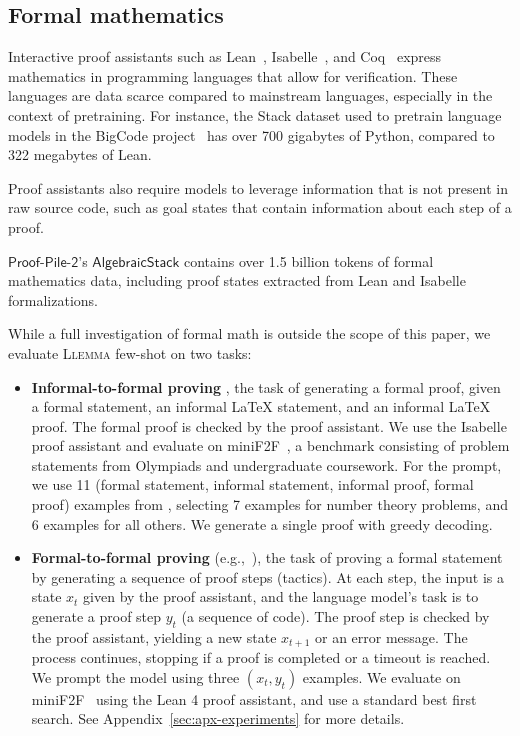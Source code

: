 \subsection{Formal mathematics} Interactive proof assistants such as Lean~\citep{de2015lean}, Isabelle~\citep{wenzel2008isabelle}, and Coq~\citep{paulin1989extracting,paulin1989extraction} express mathematics in  programming languages that allow for verification. These languages are data scarce compared to mainstream languages, especially in the context of pretraining. For instance, the Stack dataset used to pretrain language models in the BigCode project~\citep{allal2023santacoder} has over 700 gigabytes of Python, compared to 322 megabytes of Lean.

Proof assistants also require models to leverage information that is not present in raw source code, such as goal states that contain information about each step of a proof.

$\mathsf{Proof}$-$\mathsf{Pile}$-$\mathsf{2}$'s $\mathsf{AlgebraicStack}$   contains over 1.5 billion tokens of formal mathematics data, including proof states extracted from  Lean and Isabelle formalizations.

While a full investigation of formal math is outside the scope of this paper, we evaluate \textsc{Llemma} few-shot on two tasks:

\begin{itemize}[leftmargin=*]
\item \textbf{Informal-to-formal proving} \citep{jiang2023draft}, the task of generating a formal proof, given a formal statement, an informal \LaTeX{} statement, and an informal \LaTeX{} proof. The formal proof is checked by the proof assistant. We use the Isabelle proof assistant and evaluate on miniF2F~\citep{zheng2021minif2f}, a benchmark consisting of problem statements from Olympiads and undergraduate coursework. For the prompt, we use 11 (formal statement, informal statement, informal proof, formal proof) examples from \cite{jiang2023draft}, selecting 7 examples for number theory problems, and 6 examples for all others. We generate a single proof with greedy decoding.

\item \textbf{Formal-to-formal proving} (e.g.,~\cite{polu2020generative}), the task of proving a formal statement by generating a sequence of proof steps (tactics). At each step, the input is a state $x_t$ given by the proof assistant, and the language model's task is to generate a proof step $y_t$ (a sequence of code). The proof step is checked by the proof assistant, yielding a new state $x_{t+1}$ or an error message. The process continues, stopping if a proof is completed or a timeout is reached. We prompt the model using three $(x_t, y_t)$ examples. We evaluate on miniF2F~\citep{zheng2021minif2f} using the Lean 4 proof assistant, and use a standard best first search. See Appendix~\ref{sec:apx-experiments} for more details. 
\end{itemize}

